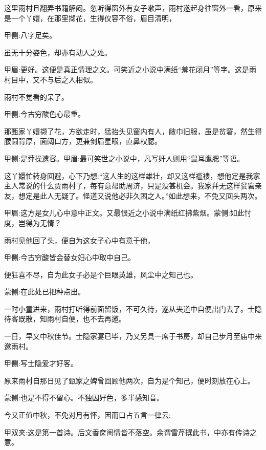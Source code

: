 \begin{parag}
    这里雨村且翻弄书籍解闷。忽听得窗外有女子嗽声，雨村遂起身往窗外一看，原来是一个丫嬛，在那里撷花，生得仪容不俗，眉目清明，\begin{note}甲侧:八字足矣。\end{note}虽无十分姿色，却亦有动人之处。\begin{note}甲眉:更好。这便是真正情理之文。可笑近之小说中满纸“羞花闭月”等字。这是雨村目中，又不与后之人相似。\end{note}雨村不觉看的呆了。\begin{note}甲侧:今古穷酸色心最重。\end{note}那甄家丫嬛撷了花，方欲走时，猛抬头见窗内有人，敝巾旧服，虽是贫窘，然生得腰圆背厚，面阔口方，更兼剑眉星眼，直鼻权腮。\begin{note}甲侧:是莽操遗容。甲眉:最可笑世之小说中，凡写奸人则用“鼠耳鹰腮”等语。\end{note}这丫嬛忙转身回避，心下乃想:“这人生的这样雄壮，却又这样褴褛，想他定是我家主人常说的什么贾雨村了，每有意帮助周济，只是没甚机会。我家幷无这样贫窘亲友，想定是此人无疑了。怪道又说他必非久困之人。”如此想来，不免又回头两次。\begin{note}甲眉:这方是女儿心中意中正文。又最恨近之小说中满纸红拂紫烟。蒙侧:如此忖度，岂得为无情？\end{note}雨村见他回了头，便自为这女子心中有意于他，\begin{note}甲侧:今古穷酸皆会替女妇心中取中自己。\end{note}便狂喜不尽，自为此女子必是个巨眼英雄，风尘中之知己也。\begin{note}蒙侧:在此处已把种点出。\end{note}一时小童进来，雨村打听得前面留饭，不可久待，遂从夹道中自便出门去了。士隐待客既散，知雨村自便，也不去再邀。
\end{parag}


\begin{parag}
    一日，早又中秋佳节。士隐家宴已毕，乃又另具一席于书房，却自己步月至庙中来邀雨村。\begin{note}甲侧:写士隐爱才好客。\end{note}原来雨村自那日见了甄家之婢曾回顾他两次，自为是个知己，便时刻放在心上。\begin{note}蒙侧:也是不得不留心。不独因好色，多半感知音。\end{note}今又正值中秋，不免对月有怀，因而口占五言一律云:\begin{note}甲双夹:这是第一首诗。后文香奁闺情皆不落空。余谓雪芹撰此书，中亦有传诗之意。\end{note}
\end{parag}


